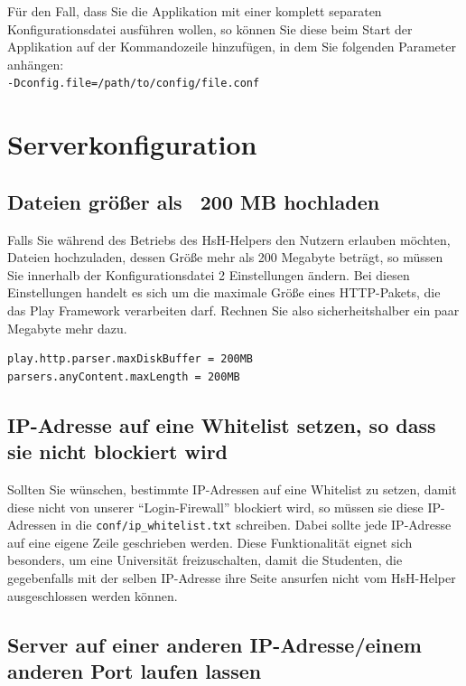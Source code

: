 \documentclass[12pt,DIV14,BCOR10mm,a4paper,parskip=half-,headsepline,headinclude,english,ngerman,bibliography=totocnumbered]{scrreprt}
\begin{document}
Für den Fall, dass Sie die Applikation mit einer komplett separaten Konfigurationsdatei ausführen wollen, so können Sie diese beim Start der Applikation auf der Kommandozeile hinzufügen, in dem Sie folgenden Parameter anhängen: \\
\texttt{-Dconfig.file=/path/to/config/file.conf}

\section{Serverkonfiguration}

\subsection{Dateien größer als ~200 MB hochladen}

Falls Sie während des Betriebs des HsH-Helpers den Nutzern erlauben möchten, Dateien hochzuladen, dessen Größe mehr als 200 Megabyte beträgt, so müssen Sie innerhalb der Konfigurationsdatei 2 Einstellungen ändern.
Bei diesen Einstellungen handelt es sich um die maximale Größe eines HTTP-Pakets, die das Play Framework verarbeiten darf.
Rechnen Sie also sicherheitshalber ein paar Megabyte mehr dazu.

\begin{lstlisting}[label=server-max-file-upload, caption={"Dateigröße und HTTP-Paketgröße"-Einstellung innerhalb der Konfigurationsdatei}, captionpos=b]
play.http.parser.maxDiskBuffer = 200MB
parsers.anyContent.maxLength = 200MB
\end{lstlisting}

\subsection{IP-Adresse auf eine Whitelist setzen, so dass sie nicht blockiert wird}

Sollten Sie wünschen, bestimmte IP-Adressen auf eine Whitelist zu setzen, damit diese nicht von unserer \enquote{Login-Firewall} blockiert wird, so müssen sie diese IP-Adressen in die \texttt{conf/ip\_whitelist.txt} schreiben.
Dabei sollte jede IP-Adresse auf eine eigene Zeile geschrieben werden.
Diese Funktionalität eignet sich besonders, um eine Universität freizuschalten, damit die Studenten, die gegebenfalls mit der selben IP-Adresse ihre Seite ansurfen nicht vom HsH-Helper ausgeschlossen werden können.

\subsection{Server auf einer anderen IP-Adresse/einem anderen Port laufen lassen}
\end{document}
